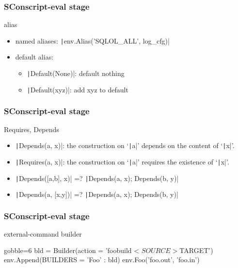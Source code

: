 \documentclass[lualatex]{beamer}
\begin{document}
\begin{frame}[fragile]
  \frametitle{SConscript-eval stage}

  \begin{block}{alias}
    \begin{itemize}
    \item named aliases: \texttt|env.Alias('SQLOL_ALL', log_cfg)|
    \item default alias:
      \begin{itemize}
      \item \texttt|Default(None)|:  default nothing
      \item \texttt|Default(xyz)|: add xyz to default
      \end{itemize}
    \end{itemize}
  \end{block}
\end{frame}

\begin{frame}[fragile]
  \frametitle{SConscript-eval stage}

  \begin{block}{Requires, Depends}
    \begin{itemize}
    \item \texttt|Depends(a, x)|:
      the construction on `\texttt|a|' depends on the content of `\texttt|x|'.
    \item \texttt|Requires(a, x)|:
      the construction on `\texttt|a|' requires the existence of `\texttt|x|'.
    \item<2-> \texttt|Depends([a,b], x)| =? \texttt|Depends(a, x); Depends(b, y)|
    \item<3-> \texttt|Depends(a, [x,y])| =? \texttt|Depends(a, x); Depends(b, y)|
    \end{itemize}
  \end{block}
\end{frame}

\begin{frame}[fragile]
  \frametitle{SConscript-eval stage}

  \begin{block}{external-command builder}
    \begin{py*}{gobble=6}
      bld = Builder(action = 'foobuild < $SOURCE > $TARGET')
      env.Append(BUILDERS = {'Foo' : bld})
      env.Foo('foo.out', 'foo.in')
    \end{py*}
  \end{block}
\end{frame}
\end{document}
